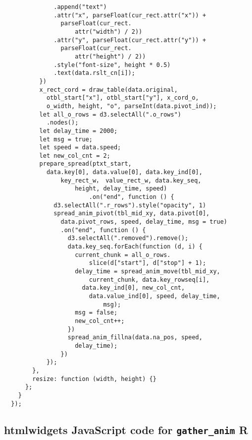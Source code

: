 \begin{lstlisting}
              .append("text")
              .attr("x", parseFloat(cur_rect.attr("x")) + 
                parseFloat(cur_rect.
                    attr("width") / 2))
              .attr("y", parseFloat(cur_rect.attr("y")) + 
                parseFloat(cur_rect.
                    attr("height") / 2))
              .style("font-size", height * 0.5)
              .text(data.rslt_cn[i]);
          })
          x_rect_cord = draw_table(data.original, 
            otbl_start["x"], otbl_start["y"], x_cord_o,
            o_width, height, "o", parseInt(data.pivot_ind));
          let all_o_rows = d3.selectAll(".o_rows")
            .nodes();
          let delay_time = 2000;
          let msg = true;
          let speed = data.speed;
          let new_col_cnt = 2;
          prepare_spread(ptxt_start, 
            data.key[0], data.value[0], data.key_ind[0], 
                key_rect_w， value_rect_w, data.key_seq, 
                    height, delay_time, speed)
                        .on("end", function () {
              d3.selectAll(".r_rows").style("opacity", 1)
              spread_anim_pivot(tbl_mid_xy, data.pivot[0], 
                data.pivot_rows, speed, delay_time, msg = true)
                .on("end", function () {
                  d3.selectAll(".removed").remove();
                  data.key_seq.forEach(function (d, i) {
                    current_chunk = all_o_rows.
                        slice(d["start"], d["stop"] + 1);
                    delay_time = spread_anim_move(tbl_mid_xy, 
                        current_chunk, data.key_rowseq[i],
                      data.key_ind[0], new_col_cnt, 
                        data.value_ind[0], speed, delay_time, 
                            msg);
                    msg = false;
                    new_col_cnt++;
                  })
                  spread_anim_fillna(data.na_pos, speed, 
                    delay_time);
                })
            });
        },
        resize: function (width, height) {}
      };
    }
  });

\end{lstlisting}

\subsection{\textbf{htmlwidgets} \textsf{JavaScript} code for \texttt{gather\_anim} \textbf{R}}


